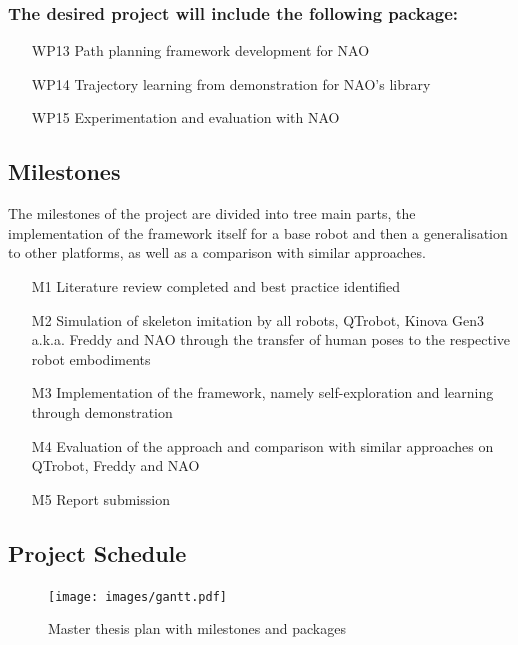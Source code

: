 \documentclass[thesis]{mas_proposal}
\begin{document}
	\subsubsection{The desired project will include the following package:}
	
		\begin{enumerate}
			\item[WP13] Path planning framework development for NAO
			\item[WP14] Trajectory learning from demonstration for NAO's library
			\item[WP15] Experimentation and evaluation with NAO
		\end{enumerate}
	
	\subsection{Milestones}
		
		The milestones of the project are divided into tree main parts, the implementation of the framework itself for a base robot and then a generalisation to other platforms, as well as a comparison with similar approaches.
		
		\begin{enumerate}
		    \item[M1] Literature review completed and best practice identified
		  	\item[M2] Simulation of skeleton imitation by all robots, QTrobot, Kinova Gen3 a.k.a. Freddy and NAO through the transfer of human poses to the respective robot embodiments
		    \item[M3] Implementation of the framework, namely self-exploration and learning through demonstration
		    \item[M4] Evaluation of the approach and comparison with similar approaches on QTrobot, Freddy and NAO
		    \item[M5] Report submission
		\end{enumerate}
	
	\subsection{Project Schedule}

	\begin{figure}[h!]
	    \texttt{[image: images/gantt.pdf]}
	    \caption{Master thesis plan with milestones and packages}
	    \label{fig:gantt}
	\end{figure}
\end{document}
